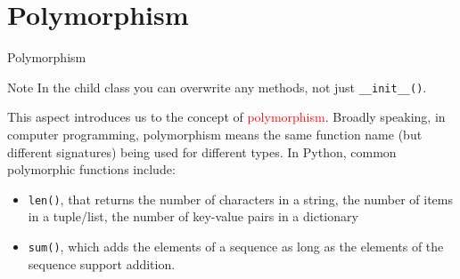 \documentclass[t,handout,9pt]{beamer}
\begin{document}
\section{Polymorphism}
\begin{frame}{Polymorphism}
\vfill
\begin{block}{Note}
In the child class you can overwrite any methods, not just \texttt{\_\_init\_\_()}.
\end{block}
\vfill
This aspect introduces us to the concept of \textcolor{red}{polymorphism}.
\vfill
Broadly speaking, in computer programming, polymorphism means the same function name (but different signatures) being used for different types.
\vfill
In Python, common polymorphic functions include:
\begin{itemize}
	\item \texttt{len()}, that returns the number of characters in a string, the number of items in a tuple/list, the number of key-value pairs in a dictionary
	\item \texttt{sum()}, which adds the elements of a sequence as long as the elements of the sequence support addition.
\end{itemize}
\vfill
\end{frame}
%
\end{document}
